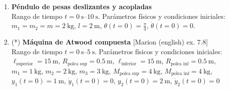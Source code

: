 \documentclass[11pt, spanish, a4paper, twoside]{article}
\begin{document}
\begin{enumerate}
\item 
	\begin{minipage}[t][3cm]{0.7\textwidth}
	\textbf{Péndulo de pesas deslizantes y acopladas}\\ 
	Rango de tiempo \(t = \SIrange{0}{10}{\second}\).
	Parámetros físicos y condiciones iniciales:\\
	\(m_1 = m_2 = m = \SI{2}{\kilo\gram}\), \(l = \SI{2}{\metre}\), \(\theta(t=0) = \frac{\pi}{4}\), \(\dot{\theta}(t=0) = 0\).
	\end{minipage}
	\begin{minipage}[c][2cm][t]{0.3\textwidth}
		
	\end{minipage}



%




\newpage
\item
\begin{minipage}[t][2cm]{0.65\textwidth}
(*) \textbf{Máquina de Atwood compuesta} [Marion (english) ex. 7.8]\\ 
Rango de tiempo \(t = \SIrange{0}{5}{\second}\).
Parámetros físicos y condiciones iniciales:\\
\(\ell_\text{superior} = \SI{15}{\metre}\), 
\(R_{\text{polea sup}} = \SI{0.5}{\metre}\), 
\(\ell_\text{inferior} = \SI{15}{\metre}\), 
\(R_{\text{polea inf}} = \SI{0.5}{\metre}\),\\ 
\(m_1 = \SI{1}{\kilo\gram}\),
\(m_2 = \SI{2}{\kilo\gram}\),
\(m_3 = \SI{3}{\kilo\gram}\),
\(M_{\text{polea sup}} = \SI{4}{\kilo\gram}\),
\(M_{\text{polea inf}} = \SI{4}{\kilo\gram}\),\\
\(y_1(t=0) = \SI{1}{\metre}\), \(\dot{y}_1(t=0) = 0\),
\(y_2(t=0) = \SI{2}{\metre}\), \(\dot{y}_2(t=0) = 0\)
\end{minipage}
\begin{minipage}[c][3cm][t]{0.3\textwidth}
	
\end{minipage}




\end{enumerate}
\end{document}
